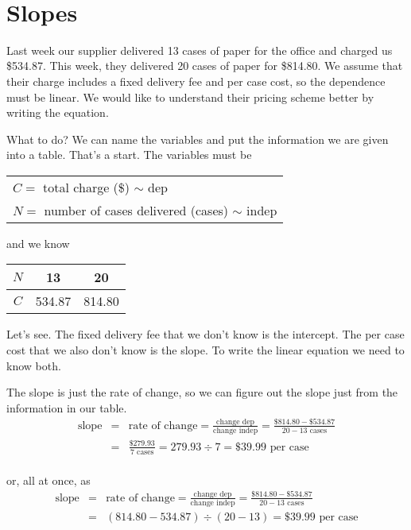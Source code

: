 ~\vspace{.1in}

\section{Slopes}

Last week our supplier delivered 13 cases of paper for the office and charged us \$534.87.  This week, they delivered 20 cases of paper for \$814.80. We assume that their charge includes a fixed delivery fee and per case cost, so the dependence must be linear.  We would like to understand their pricing scheme better by writing the equation.

What to do?  We can name the variables and put the information we are given into a table.  That's a start.  The variables must be
\begin{center}
\begin{tabular} {l} 
$C=$ total charge (\$) $\sim$ dep \\ 
$N =$ number of cases delivered (cases) $\sim$ indep \\
\end{tabular}
\end{center}
and we know
\begin{center}
\begin{tabular} {|c| |c |c|}\hline
$N$ & 13 &  20\\ \hline
$C$ &534.87 & 814.80\\ \hline
\end{tabular}
\end{center}

Let's see.  The fixed delivery fee that we don't know is the intercept.  The per case cost that we also don't know is the slope.  To write the linear equation we need to know both.

The slope is just the rate of change, so we can figure out the slope just from the information in our table.
\begin{eqnarray*}
\text{slope} & = & \text{rate of change} = \frac{\text{change dep}}{\text{change indep}} = \frac{\$814.80-\$534.87}{20-13 \text{ cases}} \\
& = & \frac{\$279.93}{7 \text{ cases}} = 279.93 \div 7 = \$39.99 \text{ per case}\\
\end{eqnarray*}
\vspace{-.5in} %

\noindent  or, all at once, as
 \begin{eqnarray*}
\text{slope} & = & \text{rate of change} = \frac{\text{change dep}}{\text{change indep}} = \frac{\$814.80-\$534.87}{20-13 \text{ cases}} \\
& = & (814.80-534.87)\div(20-13)= \$39.99 \text{ per case}\\
\end{eqnarray*}
\vspace{-.5in} %

